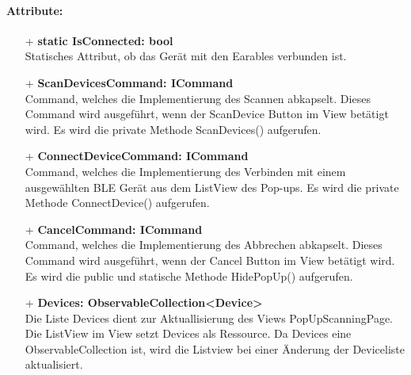 \documentclass[a4paper,12pt]{article}
\begin{document}
	\paragraph{Attribute:}
	\begin{itemize}
		\item[+] \textbf{static IsConnected: bool}\\Statisches Attribut, ob das Gerät mit den \gls{Earables} verbunden ist.
		\item[+] \textbf{ScanDevicesCommand: ICommand}\\Command, welches die Implementierung des Scannen abkapselt. Dieses Command wird ausgeführt, wenn der ScanDevice Button im View betätigt wird. Es wird die private Methode ScanDevices() aufgerufen.
		\item[+] \textbf{ConnectDeviceCommand: ICommand}\\Command, welches die Implementierung des Verbinden mit einem ausgewählten BLE Gerät aus dem ListView des Pop-ups. Es wird die private Methode ConnectDevice() aufgerufen.
		\item[+] \textbf{CancelCommand: ICommand}\\Command, welches die Implementierung des Abbrechen abkapselt. Dieses Command wird ausgeführt, wenn der Cancel Button im View betätigt wird. Es wird die public und statische Methode HidePopUp() aufgerufen. 
		\item[+] \textbf{Devices: ObservableCollection<Device>}\\Die Liste Devices dient zur Aktuallisierung des Views PopUpScanningPage. Die ListView im View setzt Devices als Ressource. Da Devices eine ObservableCollection ist, wird die Listview bei einer Änderung der Deviceliste aktualisiert.
	\end{itemize}
\end{document}
